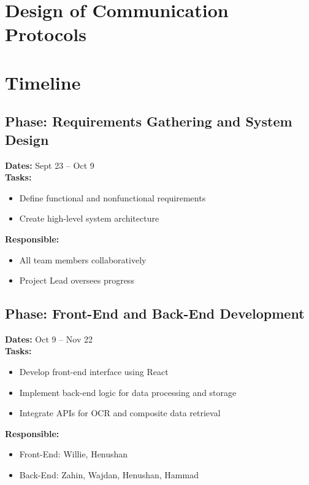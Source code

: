 \documentclass[12pt, titlepage]{article}
\begin{document}
\section{Design of Communication Protocols}


\section{Timeline}


\subsection{Phase: Requirements Gathering and System Design}
\textbf{Dates:} Sept 23 – Oct 9 \\
\textbf{Tasks:}
\begin{itemize}
  \item Define functional and nonfunctional requirements
  \item Create high-level system architecture
\end{itemize}
\textbf{Responsible:}
\begin{itemize}
  \item All team members collaboratively
  \item Project Lead oversees progress
\end{itemize}


\subsection{Phase: Front-End and Back-End Development}
\textbf{Dates:} Oct 9 – Nov 22 \\
\textbf{Tasks:}
\begin{itemize}
  \item Develop front-end interface using React
  \item Implement back-end logic for data processing and storage
  \item Integrate APIs for OCR and composite data retrieval
\end{itemize}
\textbf{Responsible:}
\begin{itemize}
  \item Front-End: Willie, Henushan
  \item Back-End: Zahin, Wajdan, Henushan, Hammad
\end{itemize}
\end{document}
